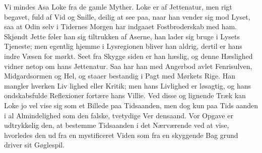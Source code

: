 \documentclass[12pt]{book}
\newcommand{\opage}[1]{\marginnote{\footnotesize\textit{[#1]}}}
\begin{document}
Vi mindes Asa Loke fra de gamle Myther. Loke
er af Jettenatur, men rigt begavet, fuld af Vid og
Snille, deilig at see paa, naar han vender sig mod
Lyset, saa at Odin selv i Tidernes Morgen har indgaaet
Fostbroderskab med ham. Skjøndt Jette føler han sig
tiltrukken af Aserne, han lader sig bruge i Lysets Tjeneste;
\opage{58}\setcounter{footnote}{0}%
men egentlig hjemme i Lysregionen bliver han aldrig,
dertil er hans indre Væsen for mørkt. Seet fra Skygge\-%
siden er han hæslig, og denne Hæslighed vidner netop
om hans Jettenatur. Saa har han med Angerbod avlet
Fenrisulven, Midgardsormen og Hel, og staaer bestandig
i Pagt med Mørkets Rige. Han mangler hverken Liv\-%
lighed eller Kritik; men hans Livlighed er løsagtig, og
hans ondskabsfulde Reflexioner fortære hans Villie.
Ved disse og lignende Træk kan Loke jo vel vise sig
som et Billede paa Tidsaanden, men dog kun paa Tids\-%
aanden i al Almindelighed som den falske, tvetydige Ver\-%
densaand. Vor Opgave er udtrykkelig den, at bestemme
Tidsaanden i det Nærværende ved at vise, hvorledes den
ud fra en mystificeret Viden som fra en skyggende Bag\-%
grund driver sit Gøglespil.
\end{document}
